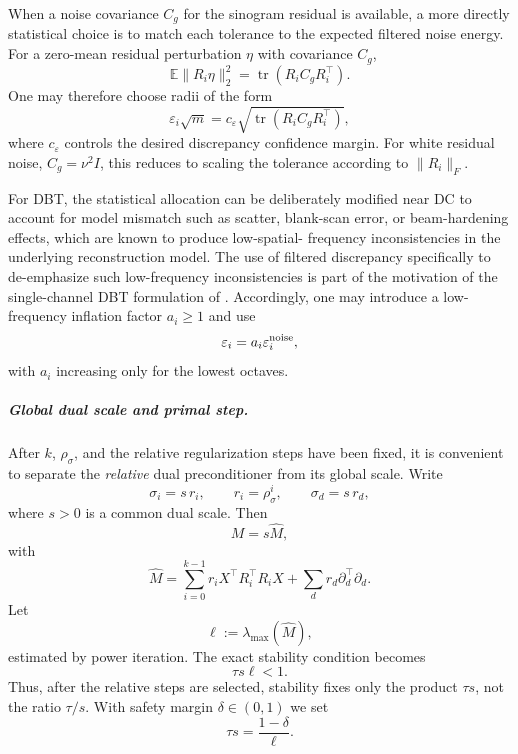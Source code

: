 \documentclass{article}
\begin{document}
When a noise covariance $C_g$ for the sinogram residual is available,
a more directly statistical choice is to match each tolerance to the
expected filtered noise energy.  For a zero-mean residual perturbation
$\eta$ with covariance $C_g$,
\begin{equation}
\label{eq:filtered-noise-energy}
\mathbb E\|R_i\eta\|_2^2
=
\operatorname{tr}(R_iC_gR_i^\top).
\end{equation}
One may therefore choose radii of the form
\begin{equation}
\label{eq:tolerance-noise}
\varepsilon_i\sqrt m
=
c_\varepsilon
\sqrt{\operatorname{tr}(R_iC_gR_i^\top)},
\end{equation}
where $c_\varepsilon$ controls the desired discrepancy confidence
margin.  For white residual noise, $C_g=\nu^2I$, this reduces to
scaling the tolerance according to
$\|R_i\|_F$.

For DBT, the statistical allocation can be deliberately modified near
DC to account for model mismatch such as scatter, blank-scan error, or
beam-hardening effects, which are known to produce low-spatial-
frequency inconsistencies in the underlying reconstruction model.
The use of filtered discrepancy specifically to de-emphasize such
low-frequency inconsistencies is part of the motivation of the
single-channel DBT formulation of \citet{sidky2025accurate}.
Accordingly, one may introduce a low-frequency inflation factor
$a_i\ge1$ and use
\[
\varepsilon_i
=
a_i\varepsilon_i^{\rm noise},
\]
with $a_i$ increasing only for the lowest octaves.

\subparagraph{Global dual scale and primal step.}
After $k$, $\rho_\sigma$, and the relative regularization steps have
been fixed, it is convenient to separate the \emph{relative} dual
preconditioner from its global scale.  Write
\begin{equation}
\label{eq:dual-common-scale}
\sigma_i=s\,r_i,
\qquad
r_i=\rho_\sigma^i,
\qquad
\sigma_d=s\,r_d,
\end{equation}
where $s>0$ is a common dual scale.  Then
\[
M=s\widehat M,
\]
with
\begin{equation}
\label{eq:M-ratio}
\widehat M
=
\sum_{i=0}^{k-1}
r_iX^\top R_i^\top R_iX
+
\sum_d
r_d\partial_d^\top\partial_d.
\end{equation}
Let
\[
\ell:=\lambda_{\max}(\widehat M),
\]
estimated by power iteration.  The exact stability condition becomes
\begin{equation}
\label{eq:scale-product}
\tau s\ell<1.
\end{equation}
Thus, after the relative steps are selected, stability fixes only the
product $\tau s$, not the ratio $\tau/s$.  With safety margin
$\delta\in(0,1)$ we set
\begin{equation}
\label{eq:scale-saturation}
\tau s
=
\frac{1-\delta}{\ell}.
\end{equation}
\end{document}
